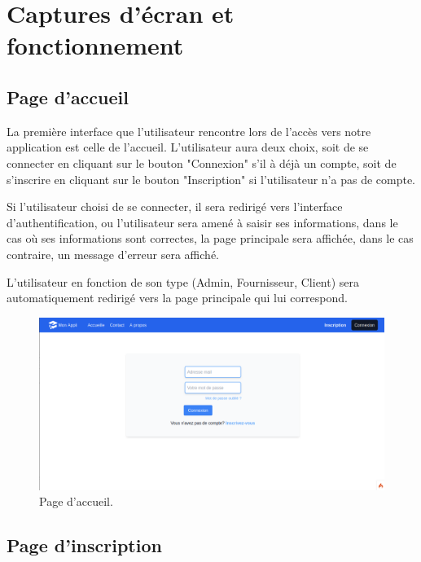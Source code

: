 \documentclass[french]{report}
\begin{document}
        \section{Captures d’écran et fonctionnement}
            \subsection{Page d'accueil}
            
            La première interface que l'utilisateur rencontre lors de l'accès vers
	    notre application est celle de l'accueil. L'utilisateur aura deux choix,
	    soit de se connecter en cliquant sur le bouton "Connexion" s'il à déjà un compte,
	    soit de s'inscrire en cliquant sur le bouton "Inscription" si l'utilisateur n'a pas de compte.
            
            Si l'utilisateur choisi de se connecter, il sera redirigé vers l'interface 
	    d'authentification, ou l'utilisateur sera amené à saisir ses informations,
	    dans le cas où ses informations sont correctes, la page principale sera affichée,
	    dans le cas contraire, un message d'erreur sera affiché.
            
            L'utilisateur en fonction de son type (Admin, Fournisseur, Client) sera automatiquement
	    redirigé vers la page principale qui lui correspond.

            \begin{figure}[H]
                \centering
                \includegraphics[width=1\textwidth]{images/accueil.png}
                \caption{Page d'accueil.}
            \end{figure}
            
            \subsection{Page d'inscription}
            
\end{document}
